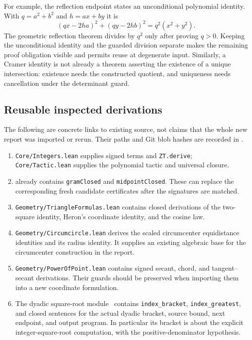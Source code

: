 For example, the reflection endpoint states an unconditional polynomial
identity.  With $q=a^2+b^2$ and $h=ax+by$ it is
\[
 (qx-2ha)^2+(qy-2hb)^2=q^2(x^2+y^2).
\]
The geometric reflection theorem divides by $q^2$ only after proving $q>0$.
Keeping the unconditional identity and the guarded division separate makes
the remaining proof obligation visible and permits reuse at degenerate input.
Similarly, a Cramer identity is not already a theorem asserting the existence
of a unique intersection: existence needs the constructed quotient, and
uniqueness needs cancellation under the determinant guard.

\subsection{Reusable inspected derivations}

The following are concrete links to existing source, not claims that the whole
new report was imported or rerun.  Their paths and Git blob hashes are recorded
in .

\begin{enumerate}
\item \texttt{Core/Integers.lean} supplies signed terms and
\texttt{ZT.derive}; \texttt{Core/Tactic.lean} supplies the polynomial tactic and
universal closure.
\item {} already contains
\texttt{gramClosed} and \texttt{midpointClosed}.  These can replace the
corresponding fresh candidate certificates after the signatures are matched.
\item \texttt{Geometry/TriangleFormulas.lean} contains closed derivations of
the two-square identity, Heron's coordinate identity, and the cosine law.
\item \texttt{Geometry/Circumcircle.lean} derives the scaled circumcenter
equidistance identities and its radius identity.  It supplies an existing
algebraic base for the circumcenter construction in the report.
\item \texttt{Geometry/PowerOfPoint.lean} contains signed secant, chord, and
tangent--secant derivations.  Their guards should be preserved when importing
them into a new coordinate formulation.
\item The dyadic square-root module~\cite{repo-sqrt} contains
\texttt{index\_bracket}, \texttt{index\_greatest}, and closed sentences for the
actual dyadic bracket, source bound, next endpoint, and output program.  In
particular its bracket is about the explicit integer-square-root computation,
with the positive-denominator hypothesis.
\end{enumerate}

